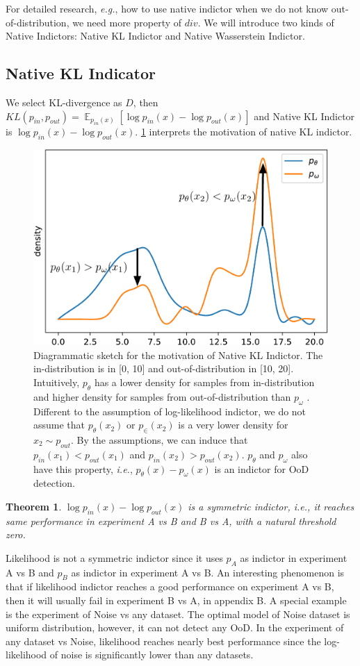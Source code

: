 \documentclass[letterpaper]{article} %
\newtheorem{theorem}{Theorem}
\newcommand{\IE}{\textit{i.e.}, }
\newcommand{\EG}{\textit{e.g.}, }
\newcommand{\E}{\operatorname{\mathbb{E}}}
\newcommand{\pin}{p_{in}}
\newcommand{\pout}{p_{out}}
\begin{document}
For detailed research, \EG how to use native indictor when we do not know out-of-distribution, we need more property of $div$. 
We will introduce two kinds of Native Indictors: Native KL Indictor and Native Wasserstein Indictor. 

\subsection{Native KL Indicator}
We select KL-divergence as $D$, then $KL(\pin, \pout) = \E_{\pin(x)} [\log \pin(x) - \log \pout(x)]$ and Native KL Indictor is $\log \pin(x) - \log \pout(x)$. \cref{fig3} interprets the motivation of native KL indictor. 
\begin{figure}
	\center
	\includegraphics[width=0.9\columnwidth]{diagram}
	\caption{Diagrammatic sketch for the motivation of Native KL Indictor. The in-distribution is in [0, 10] and out-of-distribution in [10, 20]. Intuitively, $p_\theta$ has a lower density for samples from in-distribution and higher density for samples from out-of-distribution than $p_\omega$ . 
	Different to the assumption of log-likelihood indictor, we do not assume that $p_\theta(x_2)$ or $p_\in(x_2)$ is a very lower density for $x_2 \sim \pout$. By the assumptions, we can induce that $\pin(x_1) < \pout(x_1)$ and $\pin(x_2) > \pout(x_2)$. $p_\theta$ and $p_\omega$ also have this property, \IE $p_\theta(x) - p_\omega(x)$ is an indictor for OoD detection. }
	\label{fig3}
\end{figure}

\begin{theorem}\label{thm1}
	$\log \pin(x) - \log \pout(x)$ is a symmetric indictor, \IE it reaches same performance in experiment A vs B and B vs A, with a natural threshold zero. 
\end{theorem}
Likelihood is not a symmetric indictor since it uses $p_A$ as indictor in experiment A vs B and $p_B$ as indictor in experiment A vs B. An interesting phenomenon is that if likelihood indictor reaches a good performance on experiment A vs B, then it will usually fail in experiment B vs A, in appendix B. A special example is the experiment of Noise vs any dataset. The optimal model of Noise dataset is uniform distribution, however, it can not detect any OoD. In the experiment of any dataset vs Noise, likelihood reaches nearly best performance since the log-likelihood of noise is significantly lower than any datasets. 
\end{document}
